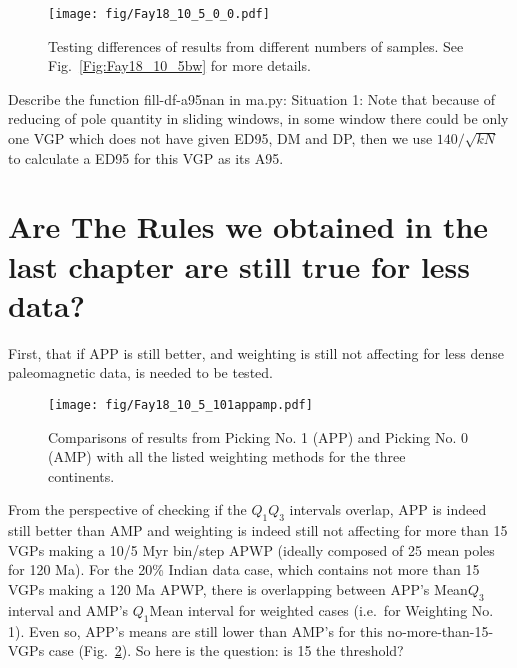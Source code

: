 \begin{figure}
    \centering
        \texttt{[image: fig/Fay18\_10\_5\_0\_0.pdf]}
    \captionsetup{width=.95\textwidth}
    \caption{Testing differences of results from different numbers of samples.
	See Fig.~\ref{Fig:Fay18_10_5bw} for more details.}\label{Fig:Fay18_10_5_0_0}
\end{figure}

Describe the function fill-df-a95nan in ma.py:
Situation 1: Note that because of reducing of pole quantity in sliding windows,
in some window there could be only one VGP which does not have given ED95, DM
and DP, then we use $140/\sqrt{kN}$~\cite{T91,T19} to calculate a ED95 for this
VGP as its A95.

\section{Are The Rules we obtained in the last chapter are still true for less
data?}

First, that if APP is still better, and weighting is still not affecting for
less dense paleomagnetic data, is needed to be tested.

\begin{figure}
    \centering
        \texttt{[image: fig/Fay18\_10\_5\_101appamp.pdf]}
    \captionsetup{width=1\textwidth}
    \caption{Comparisons of results from Picking No. 1 (APP) and Picking No. 0
	(AMP) with all the listed weighting methods for the three
	continents.}\label{Fig:Fay18_10_5_101appamp}
\end{figure}

From the perspective of checking if the $Q_1$\textendash$Q_3$ intervals overlap,
APP is indeed still better than AMP and weighting is indeed still not affecting
for more than 15 VGPs making a 10/5 Myr bin/step APWP (ideally composed of 25
mean poles for 120 Ma). For the 20\% Indian data case, which
contains not more than 15 VGPs making a 120 Ma APWP, there is
overlapping between APP's Mean\textendash$Q_3$ interval and AMP's
$Q_1$\textendash{}Mean interval for weighted cases (i.e.\ for Weighting No.
1). Even so, APP's means are still lower than AMP's for this
no-more-than-15-VGPs case (Fig.~\ref{Fig:Fay18_10_5_101appamp}). So here is the
question: is 15 the threshold?
